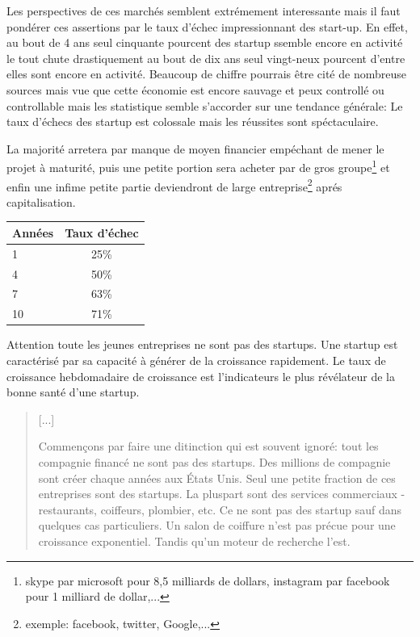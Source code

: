 \documentclass[11pt, a4paper ]{article}
\begin{document}
\begin{spacing}{1.5}
Les perspectives de ces marchés semblent extrémement interessante mais il faut pondérer ces assertions par le taux d'échec impressionnant des start-up. En effet, au bout de 4 ans seul cinquante pourcent des startup ssemble encore en activité le tout chute drastiquement au bout de dix ans seul vingt-neux pourcent d'entre elles sont encore en activité.
Beaucoup de chiffre pourrais être cité de nombreuse sources mais vue que cette économie est encore sauvage et peux controllé ou controllable mais les statistique semble s'accorder sur une tendance générale: Le taux d'échecs des startup est colossale mais les réussites sont spéctaculaire.

La majorité  arretera par manque de moyen financier empéchant de mener le projet à maturité,  puis une petite portion sera acheter par de gros groupe\footnote{ skype par microsoft pour 8,5 milliards de dollars, instagram par facebook pour 1 milliard de dollar,... } et enfin une infime petite partie deviendront de large entreprise\footnote{exemple: facebook, twitter, Google,...} aprés capitalisation.

\begin{center}
	\begin{tabular}{l*{1}{c}}
		Années  & Taux d'échec\\
		\hline
		1 & 25\% \\
		4 & 50\% \\
		7 & 63\% \\
		10 & 71\% \\
	\end{tabular}\cite{statEchecStartup}
\end{center}

Attention toute les jeunes entreprises ne sont pas des startups. Une startup est caractérisé par sa capacité à générer de la croissance rapidement. Le taux de croissance hebdomadaire de croissance est l'indicateurs le plus révélateur de la bonne santé d'une startup.

\begin{quote}
	[...]

	Commençons par faire une ditinction qui est souvent ignoré: tout les compagnie financé ne sont pas des startups. Des millions de compagnie sont créer chaque années aux États Unis. Seul une petite fraction de ces entreprises sont des startups. La pluspart sont des services commerciaux - restaurants, coiffeurs, plombier, etc. Ce ne sont pas des startup sauf dans quelques cas particuliers. Un salon de coiffure n'est pas précue pour une croissance exponentiel. Tandis qu'un moteur de recherche l'est.


\end{quote}
\end{spacing}
\end{document}
